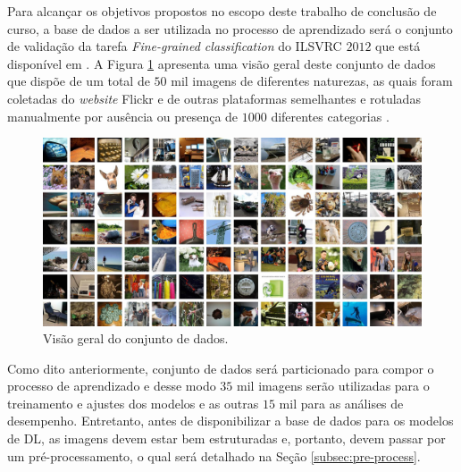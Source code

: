 Para alcançar os objetivos propostos no escopo deste trabalho de conclusão de curso, a base de dados a ser utilizada no processo de aprendizado será o conjunto de validação da tarefa \emph{Fine-grained classification} do ILSVRC $2012$ que está disponível em \cite{ref:image-net}. A Figura \ref{fig:visaogeral} apresenta uma visão geral deste conjunto de dados que dispõe de um total de $50$ mil imagens de diferentes naturezas, as quais foram coletadas do \emph{website} Flickr e de outras plataformas semelhantes e rotuladas manualmente por ausência ou presença de $1000$ diferentes categorias \cite{ILSVRC}. 

\begin{figure}[h]
	\centering
	\includegraphics[width=1\textwidth]{./img/visaogeral}
	\caption{Visão geral do conjunto de dados.}
	\label{fig:visaogeral}
\end{figure}

Como dito anteriormente, conjunto de dados será particionado para compor o processo de aprendizado e desse modo $35$ mil imagens serão utilizadas para o treinamento e ajustes dos modelos e as outras $15$ mil para as análises de desempenho. Entretanto, antes de disponibilizar a base de dados para os modelos de DL, as imagens devem estar bem estruturadas e, portanto, devem passar por um pré-processamento, o qual será detalhado na Seção \ref{subsec:pre-process}.

